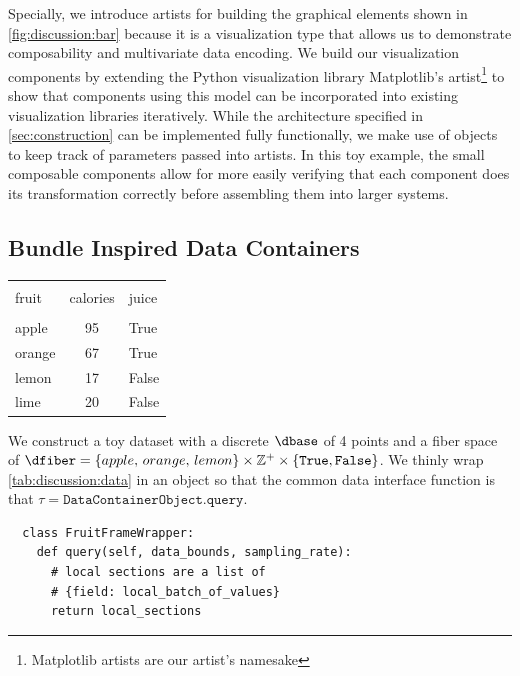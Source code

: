 \documentclass[10pt,journal,compsoc]{IEEEtran}
\theoremstyle{definition}
\theoremstyle{remark}
\begin{document}
Specially, we introduce artists for building the graphical elements shown in \autoref{fig:discussion:bar} because it is a visualization type that allows us to demonstrate composability and multivariate data encoding. We build our visualization components by extending the Python visualization library Matplotlib's artist\footnote{Matplotlib artists are our artist's namesake}\cite{hunterMatplotlib2DGraphics2007,hunterArchitectureOpenSource} to show that components using this model can be incorporated into existing visualization libraries iteratively. While the architecture specified in \autoref{sec:construction} can be implemented fully functionally, we make use of objects to keep track of parameters passed into artists. In this toy example, the small composable components allow for more easily verifying that each component does its transformation correctly before assembling them into larger systems.  

\subsection{Bundle Inspired Data Containers}
\begin{table}[h!]
  \centering
\begin{tabular}{|lcl|}
  \hline \\
   fruit &  calories &  juice \\
  \hline\\
    apple &        95 &   True \\ 
   orange &        67 &   True \\ 
  lemon &        17 &  False \\ 
      lime &        20 &  False \\
  \hline
\end{tabular}
\label{tab:discussion:data}
\end{table}
We construct a toy dataset with a discrete $\dbase$ of 4 points and a fiber space of $\dfiber=\{apple,\, orange,\, lemon\}\times \mathbb{Z}^{+} \times \{\texttt{True}, \texttt{False}\}$. We thinly wrap \autoref{tab:discussion:data} in an object so that the common data interface function is that $\tau = \texttt{DataContainerObject.query}$. 
\begin{verbatim}
  class FruitFrameWrapper:
    def query(self, data_bounds, sampling_rate):
      # local sections are a list of
      # {field: local_batch_of_values}
      return local_sections
\end{verbatim}
\end{document}
